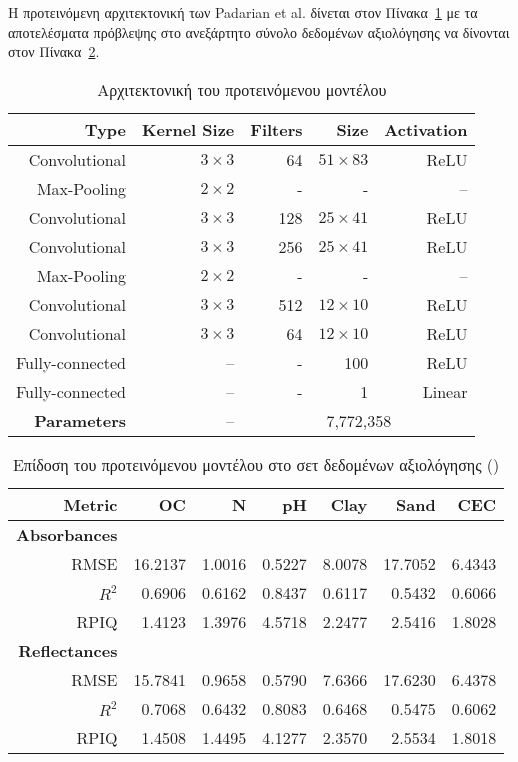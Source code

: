 Η προτεινόμενη αρχιτεκτονική των Padarian et al. δίνεται στον Πίνακα~\ref{tab:padarian.network} με τα αποτελέσματα πρόβλεψης στο ανεξάρτητο σύνολο δεδομένων αξιολόγησης να δίνονται στον Πίνακα~\ref{tab:padarian.results}.

\begin{table}[H]
    \centering
    \caption{Αρχιτεκτονική του προτεινόμενου μοντέλου}
    \label{tab:padarian.network}
    \begin{tabular}{@{}rrrrr@{}}\toprule
        Type&Kernel Size&Filters&Size&Activation\\
        \midrule
        Convolutional&$3 \times 3$&64&$51 \times 83$&ReLU\\
        Max-Pooling&$2 \times 2$&-&-&–\\
        Convolutional&$3 \times 3$&128&$25 \times 41$&ReLU\\
        Convolutional&$3 \times 3$&256&$25 \times 41$&ReLU\\
        Max-Pooling&$2 \times 2$&-&-&–\\
        Convolutional&$3 \times 3$&512&$12 \times 10$&ReLU\\
        Convolutional&$3 \times 3$&64&$12 \times 10$&ReLU\\
        Fully-connected&–&-&100&ReLU\\
        Fully-connected&–&-&1&Linear\\
        \addlinespace
        \textbf{Parameters}&–&\multicolumn{3}{c}{7,772,358}\\
        \bottomrule
    \end{tabular}
\end{table}
\begin{table}[H]
    \centering
    \caption{Επίδοση του προτεινόμενου μοντέλου στο σετ δεδομένων αξιολόγησης ()}
    \label{tab:padarian.results}
    \begin{tabular}{@{}rrrrrrr@{}}\toprule
        Metric&OC&N&pH&Clay&Sand&CEC\\
        \midrule
        \textbf{Absorbances}&\multicolumn{6}{c}{}\\
        RMSE&16.2137&1.0016&0.5227&8.0078&17.7052&6.4343\\
        $R^2$&0.6906&0.6162&0.8437&0.6117&0.5432&0.6066\\
        RPIQ&1.4123&1.3976&4.5718&2.2477&2.5416&1.8028\\
        \addlinespace
        \textbf{Reflectances}&\multicolumn{6}{c}{}\\
        RMSE&15.7841&0.9658&0.5790&7.6366&17.6230&6.4378\\
        $R^2$&0.7068&0.6432&0.8083&0.6468&0.5475&0.6062\\
        RPIQ&1.4508&1.4495&4.1277&2.3570&2.5534&1.8018\\
        \bottomrule
    \end{tabular}
\end{table}

